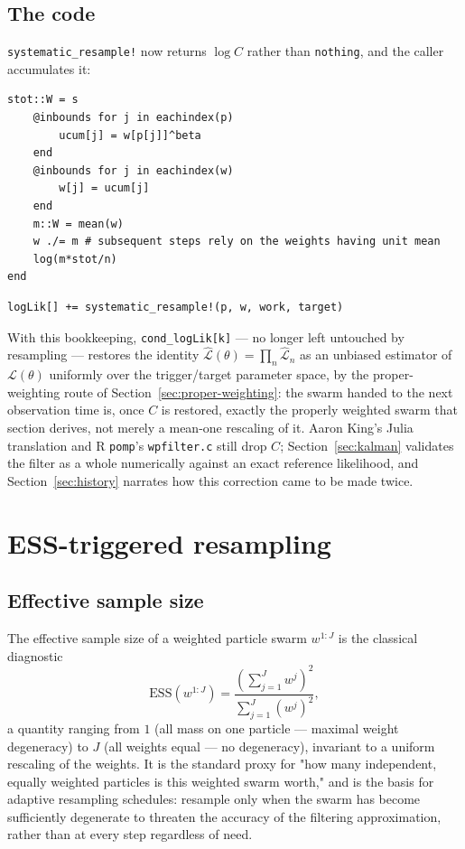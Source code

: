 \documentclass[11pt]{article}
\newcommand{\ESS}{\mathrm{ESS}}
\begin{document}
\subsection{The code}

\texttt{systematic\_resample!} now returns $\log C$ rather than
\texttt{nothing}, and the caller accumulates it:

\begin{lstlisting}[caption={The end of \texttt{systematic\_resample!} (\texttt{pfilter.jl}, lines 481--490): $C$ computed and returned}]
    stot::W = s
    @inbounds for j in eachindex(p)
        ucum[j] = w[p[j]]^beta
    end
    @inbounds for j in eachindex(w)
        w[j] = ucum[j]
    end
    m::W = mean(w)
    w ./= m # subsequent steps rely on the weights having unit mean
    log(m*stot/n)
end
\end{lstlisting}

\begin{lstlisting}[caption={The caller, \texttt{pfilt\_step\_comps!} (\texttt{pfilter.jl}, line 315): the return value is accumulated}]
        logLik[] += systematic_resample!(p, w, work, target)
\end{lstlisting}

With this bookkeeping, \texttt{cond\_logLik[k]} — no longer left untouched
by resampling — restores the identity
$\widehat{\mathcal{L}}(\theta)=\prod_n \widehat{\mathcal{L}}_n$ as an
unbiased estimator of $\mathcal{L}(\theta)$ uniformly over the trigger/target
parameter space, by the proper-weighting route of
Section~\ref{sec:proper-weighting}: the swarm handed to the next observation
time is, once $C$ is restored, exactly the properly weighted swarm that
section derives, not merely a mean-one rescaling of it. Aaron King's Julia
translation and R \texttt{pomp}'s \texttt{wpfilter.c} still drop $C$;
Section~\ref{sec:kalman} validates the filter as a whole numerically against
an exact reference likelihood, and Section~\ref{sec:history} narrates how
this correction came to be made twice.

\section{ESS-triggered resampling}
\label{sec:ess}

\subsection{Effective sample size}

The effective sample size of a weighted particle swarm $w^{1:J}$ is the
classical diagnostic
\[
\ESS(w^{1:J}) = \frac{\left(\sum_{j=1}^J w^j\right)^2}{\sum_{j=1}^J (w^j)^2},
\]
a quantity ranging from $1$ (all mass on one particle — maximal weight
degeneracy) to $J$ (all weights equal — no degeneracy), invariant to a
uniform rescaling of the weights. It is the standard proxy for "how many
independent, equally weighted particles is this weighted swarm worth,"
and is the basis for adaptive resampling schedules: resample only when the
swarm has become sufficiently degenerate to threaten the accuracy of the
filtering approximation, rather than at every step regardless of need.
\end{document}
